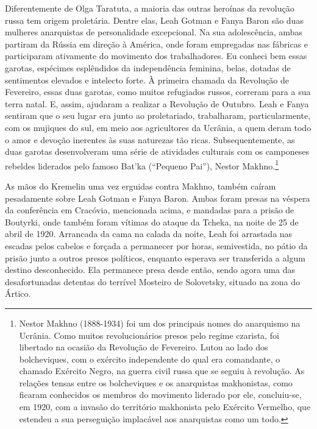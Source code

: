 Diferentemente de Olga Taratuta, a maioria das outras heroínas da
revolução russa tem origem proletária. Dentre elas, Leah Gotman e Fanya
Baron são duas mulheres anarquistas de personalidade excepcional. Na sua
adolescência, ambas partiram da Rússia em direção à América, onde foram
empregadas nas fábricas e participaram ativamente do movimento dos
trabalhadores. Eu conheci bem essas garotas, espécimes esplêndidos da
independência feminina, belas, dotadas de sentimentos elevados e
intelecto forte. À primeira chamada da Revolução de Fevereiro, essas
duas garotas, como muitos refugiados russos, correram para a sua terra
natal. E, assim, ajudaram a realizar a Revolução de Outubro. Leah e
Fanya sentiram que o seu lugar era junto ao proletariado, trabalharam,
particularmente, com os mujiques do sul, em meio aos agricultores da
Ucrânia, a quem deram todo o amor e devoção inerentes às suas naturezas
tão ricas. Subsequentemente, as duas garotas desenvolveram uma série de
atividades culturais com os camponeses rebeldes liderados pelo famoso
Bat'ka (``Pequeno Pai''), Nestor Makhno.\footnote{Nestor Makhno
  (1888-1934) foi um dos principais nomes do anarquismo na Ucrânia. Como
  muitos revolucionários presos pelo regime czarista, foi libertado na
  ocasião da Revolução de Fevereiro. Lutou ao lado dos bolcheviques, com
  o exército independente do qual era comandante, o chamado Exército
  Negro, na guerra civil russa que se seguiu à revolução. As relações
  tensas entre os bolcheviques e os anarquistas makhonistas, como
  ficaram conhecidos os membros do movimento liderado por ele,
  concluiu-se, em 1920, com a invasão do território makhonista pelo
  Exército Vermelho, que estendeu a sua perseguição implacável aos
  anarquistas como um todo.}

As mãos do Kremelin uma vez erguidas contra Makhno, também caíram
pesadamente sobre Leah Gotman e Fanya Baron. Ambas foram presas na
véspera da conferência em Cracóvia, mencionada acima, e mandadas para a
prisão de Boutyrki, onde também foram vítimas do ataque da Tcheka, na
noite de 25 de abril de 1920. Arrancada da cama na calada da noite, Leah
foi arrastada nas escadas pelos cabelos e forçada a permanecer por
horas, semivestida, no pátio da prisão junto a outros presos políticos,
enquanto esperava ser transferida a algum destino desconhecido. Ela
permanece presa desde então, sendo agora uma das desafortunadas detentas
do terrível Mosteiro de Solovetsky, situado na zona do Ártico.

